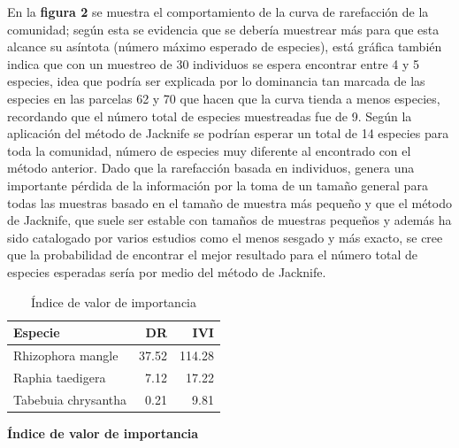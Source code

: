 \documentclass[conference,final,12pt,]{IEEEtran}
\begin{document}
En la \textbf{figura 2} se muestra el comportamiento de la curva de
rarefacción de la comunidad; según esta se evidencia que se debería
muestrear más para que esta alcance su asíntota (número máximo esperado
de especies), está gráfica también indica que con un muestreo de 30
individuos se espera encontrar entre 4 y 5 especies, idea que podría ser
explicada por lo dominancia tan marcada de las especies en las parcelas
62 y 70 que hacen que la curva tienda a menos especies, recordando que
el número total de especies muestreadas fue de 9. Según la aplicación
del método de Jacknife se podrían esperar un total de 14 especies para
toda la comunidad, número de especies muy diferente al encontrado con el
método anterior. Dado que la rarefacción basada en individuos, genera
una importante pérdida de la información por la toma de un tamaño
general para todas las muestras basado en el tamaño de muestra más
pequeño\citep{AQ} y que el método de Jacknife, que suele ser estable con
tamaños de muestras pequeños \citep{AS} y además ha sido catalogado por
varios estudios \cite{AS,AT,AU} como el menos sesgado y
más exacto, se cree que la probabilidad de encontrar el mejor resultado
para el número total de especies esperadas sería por medio del método de
Jacknife.

\begin{table}[htb]

\caption{\label{tab:unnamed-chunk-7}Índice de valor de importancia}
\centering
\begin{tabular}[t]{l|r|r}
\hline
Especie & DR & IVI\\
\hline
Rhizophora mangle & 37.52 & 114.28\\
\hline
Raphia taedigera & 7.12 & 17.22\\
\hline
Tabebuia chrysantha & 0.21 & 9.81\\
\hline
\end{tabular}
\end{table}

\textbf{Índice de valor de importancia}
\end{document}
